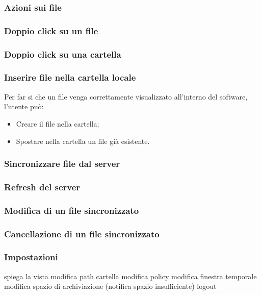 \subsubsection{Azioni sui file}

\subsubsection*{Doppio click su un file}

\subsubsection*{Doppio click su una cartella}

\subsubsection*{Inserire file nella cartella locale}
Per far si che un file venga correttamente visualizzato all'interno del software, l'utente può:
\begin{itemize}
\item Creare il file nella cartella; \
\item Spostare nella cartella un file già esistente.
\end{itemize}

\subsubsection*{Sincronizzare file dal server}

\subsubsection*{Refresh del server}

\subsubsection*{Modifica di un file sincronizzato}

\subsubsection*{Cancellazione di un file sincronizzato}

\subsubsection{Impostazioni}
\label{sec:impostazioni}
spiega la vista \newline
modifica path cartella \newline
modifica policy \newline
modifica finestra temporale \newline
modifica spazio di archiviazione (notifica spazio insufficiente) \newline
logout


